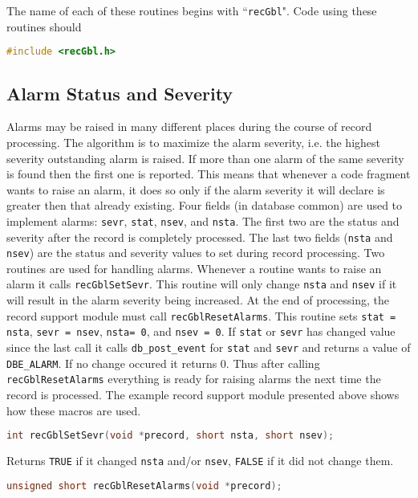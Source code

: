 The name of each of these routines begins with ``\verb|recGbl|".
Code using these routines should
\begin{lstlisting}[language=C]
#include <recGbl.h>
\end{lstlisting}

\subsection{Alarm Status and Severity}

Alarms may be raised in many different places during the course of record processing.
The algorithm is to maximize the alarm severity, i.e. the highest severity outstanding alarm is raised.
If more than one alarm of the same severity is found then the first one is reported.
This means that whenever a code fragment wants to raise an alarm, it does so only if the alarm severity it will declare is greater then that already existing.
Four fields (in database common) are used to implement alarms:
\verb|sevr|, \verb|stat|, \verb|nsev|, and \verb|nsta|.
The first two are the status and severity after the record is completely processed.
The last two fields (\verb|nsta| and \verb|nsev|) are the status and severity values to set during record processing.
Two routines are used for handling alarms.
Whenever a routine wants to raise an alarm it calls \verb|recGblSetSevr|.
This routine will only change \verb|nsta| and \verb|nsev| if it will result in the alarm severity being increased.
At the end of processing, the record support module must call \verb|recGblResetAlarms|.
This routine sets \verb|stat = nsta|, \verb|sevr = nsev|, \verb|nsta= 0|, and \verb|nsev = 0|.
If \verb|stat| or \verb|sevr| has changed value since the last call it calls \verb|db_post_event| for \verb|stat| and \verb|sevr| and returns a value of \verb|DBE_ALARM|.
If no change occured it returns 0.
Thus after calling \verb|recGblResetAlarms| everything is ready for raising alarms the next time the record is processed.
The example record support module presented above shows how these macros are used.

\begin{lstlisting}[language=C]
int recGblSetSevr(void *precord, short nsta, short nsev);
\end{lstlisting}

Returns \verb|TRUE| if it changed \verb|nsta| and/or \verb|nsev|, \verb|FALSE| if it did not change them.

\begin{lstlisting}[language=C]
unsigned short recGblResetAlarms(void *precord);
\end{lstlisting}


